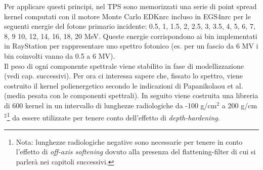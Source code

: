 {Per applicare questi principi, nel TPS sono memorizzati una serie di point spread kernel computati con il motore Monte Carlo EDKnrc incluso in EGS4nrc per le seguenti energie del fotone primario incidente: 0.5, 1, 1.5, 2, 2.5, 3, 3.5, 4, 5, 6, 7, 8, 9 10, 12, 14, 16, 18, 20 MeV. Queste energie corrispondono ai bin implementati in RayStation per rappresentare uno spettro fotonico (es. per un fascio da 6 MV i bin coinvolti vanno da 0.5 a 6 MV).\\
Il peso di ogni componente spettrale viene stabilito in fase di modellizzazione (vedi cap. successivi). Per ora ci interessa sapere che, fissato lo spettro, viene costruito il kernel polienergetico secondo le indicazioni di Papanikolaou et al. \cite{Papanikolaou1993} (media pesata con le componenti spettrali). In seguito viene costruita una libreria di 600 kernel in un intervallo di lunghezze radiologiche da -100 g/cm$^2$ a 200 g/cm$^2$\footnote{Nota: lunghezze radiologiche negative sono necessarie per tenere in conto l'effetto di \textit{off-axis softening} dovuto alla presenza del flattening-filter di cui si parlerà nei capitoli successivi.} da essere utilizzate per tenere conto dell'effetto di \textit{depth-hardening}.


}
